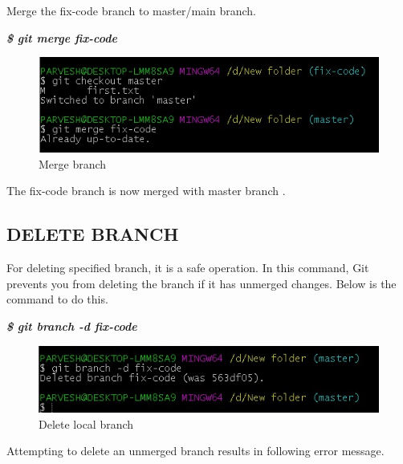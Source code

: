 \documentclass[12pt]{article}
\begin{document}
Merge the fix-code branch to master/main branch.\\

\vspace{1 mm}

\textit{\textbf{\$ git merge fix-code}}\\

\vspace{1 mm}

\begin{figure}[H]
\centering
\includegraphics[scale=0.8]{f2}
\caption{Merge branch}
\vspace{0.6\baselineskip}
\end{figure}	

The fix-code branch is now merged with master branch .

\subsection{DELETE BRANCH}
For deleting specified branch, it is a safe operation. In this command, Git prevents you from deleting the branch if it has unmerged changes. Below is the command to do this.\\

\vspace{1 mm}

\textit{\textbf{\$ git branch -d fix-code}}\\


\begin{figure}[H]
\centering
\includegraphics[scale=0.8]{f3}
\caption{Delete local branch}
\vspace{0.6\baselineskip}
\end{figure}	

Attempting to delete an unmerged branch results in following error message.\\
\end{document}

